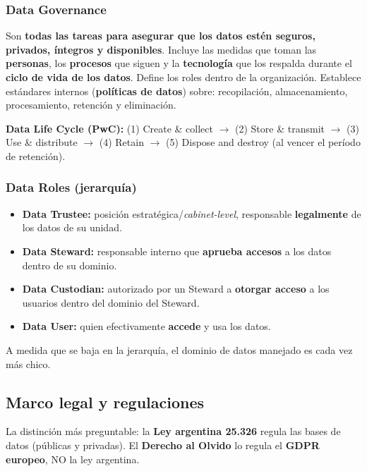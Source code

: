 \documentclass[../main.tex]{subfiles}
\begin{document}
\subsubsection{Data Governance}
Son \textbf{todas las tareas para asegurar que los datos estén seguros, privados,
íntegros y disponibles}. Incluye las medidas que toman las \textbf{personas}, los
\textbf{procesos} que siguen y la \textbf{tecnología} que los respalda durante el
\textbf{ciclo de vida de los datos}. Define los roles dentro de la organización.
Establece estándares internos (\textbf{políticas de datos}) sobre: recopilación,
almacenamiento, procesamiento, retención y eliminación.

\textbf{Data Life Cycle (PwC):} (1) Create \& collect $\to$ (2) Store \& transmit $\to$
(3) Use \& distribute $\to$ (4) Retain $\to$ (5) Dispose and destroy (al vencer el
período de retención).

\subsubsection{Data Roles (jerarquía)}
\begin{itemize}[nosep]
  \item \textbf{Data Trustee:} posición estratégica/\emph{cabinet-level}, responsable
        \textbf{legalmente} de los datos de su unidad.
  \item \textbf{Data Steward:} responsable interno que \textbf{aprueba accesos} a los
        datos dentro de su dominio.
  \item \textbf{Data Custodian:} autorizado por un Steward a \textbf{otorgar acceso}
        a los usuarios dentro del dominio del Steward.
  \item \textbf{Data User:} quien efectivamente \textbf{accede} y usa los datos.
\end{itemize}
A medida que se baja en la jerarquía, el dominio de datos manejado es cada vez más chico.

\subsection{Marco legal y regulaciones}

\begin{destacado}
La distinción más preguntable: la \textbf{Ley argentina 25.326} regula las bases de
datos (públicas y privadas). El \textbf{Derecho al Olvido} lo regula el \textbf{GDPR
europeo}, NO la ley argentina.
\end{destacado}
\end{document}
